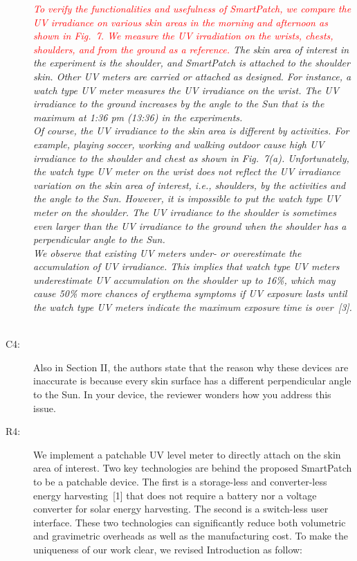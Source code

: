 \documentclass[onecolumn]{IEEEconf}
\begin{document}
\begin{description}
\textit{\textcolor{red}{To verify the functionalities and usefulness of SmartPatch, we compare the UV irradiance on various skin areas in the morning and afternoon as shown in Fig.~7. We measure the UV irradiation on the wrists, chests, shoulders, and from the ground as a reference.} The skin area of interest in the experiment is the shoulder, and SmartPatch is attached to the shoulder skin. Other UV meters are carried or attached as designed. For instance, a watch type UV meter measures the UV irradiance on the wrist. The UV irradiance to the ground increases by the angle to the Sun that is the maximum at 1:36 pm (13:36) in the experiments.\\
%
Of course, the UV irradiance to the skin area is different by activities. For example, playing soccer, working and walking outdoor cause high UV irradiance to the shoulder and chest as shown in Fig.~7(a). Unfortunately, the watch type UV meter on the wrist does not reflect the UV irradiance variation on the skin area of interest, i.e., shoulders, by the activities and the angle to the Sun. However, it is impossible to put the watch type UV meter on the shoulder. The UV irradiance to the shoulder is sometimes even larger than the UV irradiance to the ground when the shoulder has a perpendicular angle to the Sun.\\
%
We observe that existing UV meters under- or overestimate the accumulation of UV irradiance. This implies that watch type UV meters underestimate UV accumulation on the shoulder up to 16\%, which may cause 50\% more chances of erythema symptoms if UV exposure lasts until the watch type UV meters indicate the maximum exposure time is over~[3].}\\
~\\

\item [C4: ] Also in Section II, the authors state that the reason why these devices are inaccurate is because every skin surface has a different perpendicular angle to the Sun. In your device, the reviewer wonders how you address this issue.
\item [R4: ] We implement a patchable UV level meter to directly attach on the skin area of interest. Two key technologies are behind the proposed SmartPatch to be a patchable device. The first is a storage-less and converter-less energy harvesting~[1] that does not require a battery nor a voltage converter for solar energy harvesting. The second is a switch-less user interface. These two technologies can significantly reduce both volumetric and gravimetric overheads as well as the manufacturing cost. To make the uniqueness of our work clear, we revised Introduction as follow:\\


\end{description}
\end{document}
